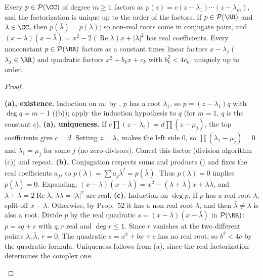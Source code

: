 \documentclass[10pt]{scrartcl}
\newcommand{\PP}{\mathcal P}\newcommand{\LL}{\mathcal L}\newcommand{\MM}{\mathcal M}\newcommand{\T}{\mathsf T}
\begin{document}
\begin{proposition*}
  \begin{enumerate}[(a)]
    \ii Every $p\in\PP(\CC)$ of degree $m\ge1$ factors as $p(z) = c(z-\lambda_1)\cdots(z-\lambda_m)$, and the factorization is unique up to the order of the factors.
    \ii If $p\in\PP(\RR)$ and $\lambda\in\CC$, then $p(\bar\lambda)=\overline{p(\lambda)}$; so non-real roots come in conjugate pairs, and $(x-\lambda)(x-\bar\lambda)=x^2-2(\operatorname{Re}\lambda)x+|\lambda|^2$ has real coefficients.
    \ii Every nonconstant $p\in\PP(\RR)$ factors as a constant times linear factors $x-\lambda_j$ ($\lambda_j\in\RR$) and quadratic factors $x^2+b_kx+c_k$ with $b_k^2<4c_k$, uniquely up to order.
  \end{enumerate}
\end{proposition*}
\begin{proof}
  \begin{steps}
    \ii \textbf{(a), existence.} Induction on $m$: by , $p$ has a root $\lambda_1$, so $p=(z-\lambda_1)q$ with $\deg q=m-1$ ((b)); apply the induction hypothesis to $q$ (for $m=1$, $q$ is the constant $c$).
    \ii \textbf{(a), uniqueness.} If $c\prod(z-\lambda_i)=d\prod(z-\mu_j)$, the top coefficients give $c=d$. Setting $z=\lambda_1$ makes the left side $0$, so $\prod(\lambda_1-\mu_j)=0$ and $\lambda_1=\mu_j$ for some $j$ (no zero divisors). Cancel this factor (division algorithm (c)) and repeat.
    \ii \textbf{(b).} Conjugation respects sums and products () and fixes the real coefficients $a_j$, so $\overline{p(\lambda)}=\sum a_j\bar\lambda^j=p(\bar\lambda)$. Thus $p(\lambda)=0$ implies $p(\bar\lambda)=0$. Expanding, $(x-\lambda)(x-\bar\lambda)=x^2-(\lambda+\bar\lambda)x+\lambda\bar\lambda$, and $\lambda+\bar\lambda=2\operatorname{Re}\lambda$, $\lambda\bar\lambda=|\lambda|^2$ are real.
    \ii \textbf{(c).} Induction on $\deg p$. If $p$ has a real root $\lambda$, split off $x-\lambda$. Otherwise, by Prop.~52 it has a non-real root $\lambda$, and then $\bar\lambda\ne\lambda$ is also a root. Divide $p$ by the real quadratic $s=(x-\lambda)(x-\bar\lambda)$ in $\PP(\RR)$: $p=sq+r$ with $q,r$ real and $\deg r\le1$. Since $r$ vanishes at the two different points $\lambda,\bar\lambda$, $r=0$. The quadratic $s=x^2+bx+c$ has no real root, so $b^2<4c$ by the quadratic formula. Uniqueness follows from (a), since the real factorization determines the complex one.
  \end{steps}
\end{proof}
\end{document}
